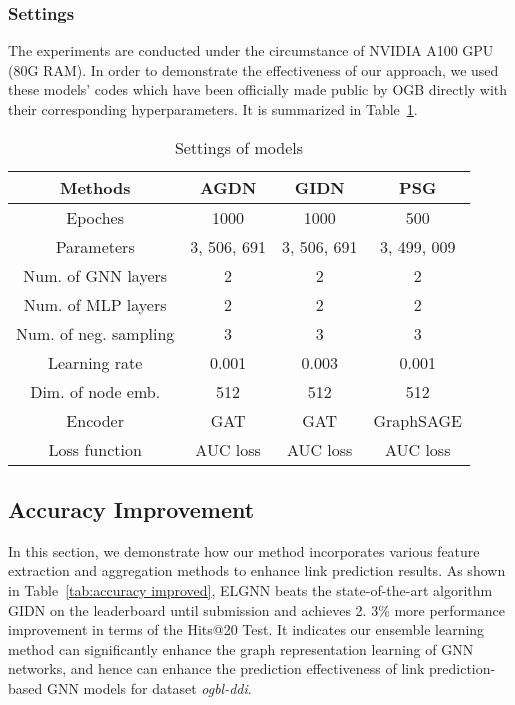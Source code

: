 \documentclass[11pt]{article}
\begin{document}
\subsubsection{Settings}
The experiments are conducted under the circumstance of NVIDIA A100 GPU (80G RAM). 
In order to demonstrate the effectiveness of our approach, 
we used these models' codes which have been officially made public by OGB directly with their corresponding hyperparameters. 
It is summarized in Table~\ref{tab:settings}. 

\begin{table}[htbp]
    \centering
    \caption{Settings of models}
    \small
    \setlength\tabcolsep{2pt}
    \begin{tabular}{c|ccc}
    \toprule
        Methods & AGDN & GIDN & PSG \\
        \midrule
         Epoches & 1000 & 1000 & 500 \\
         Parameters & 3, 506, 691 & 3, 506, 691 & 3, 499, 009 \\
         Num. of GNN layers & 2 & 2 & 2 \\
         Num. of MLP layers & 2 & 2 & 2 \\
         Num. of neg. sampling & 3 & 3 & 3\\
         Learning rate & 0.001 & 0.003 & 0.001 \\
         Dim. of node emb. & 512 & 512 &512 \\
         Encoder & GAT & GAT & GraphSAGE \\
         Loss function & AUC loss & AUC loss & AUC loss \\
         \bottomrule
    \end{tabular}
    \label{tab:settings}
\end{table}

\subsection{Accuracy Improvement}
In this section, we demonstrate how our method incorporates various feature extraction and aggregation methods to enhance link prediction results. As shown in Table~\ref{tab:accuracy improved}, ELGNN beats the state-of-the-art algorithm GIDN on the leaderboard until submission and achieves 2. 3\% more performance improvement in terms of the Hits@20 Test. It indicates our ensemble learning method can significantly enhance the graph representation learning of GNN networks, and hence can enhance the prediction effectiveness of link prediction-based GNN models for dataset \textit{ogbl-ddi}. 
\end{document}
